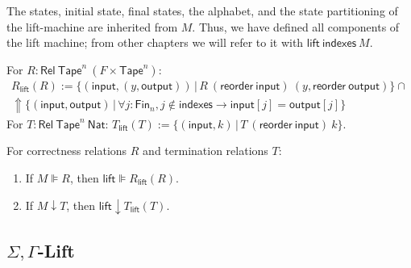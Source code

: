\documentclass{psartcl}
\newcommand{\MS}[1]{\textsf{#1}}
\newcommand{\setOf}[1]{\bigl \{ #1 \bigr \}}
\newcommand{\setMap}[2]{\setOf{#1 \,\big|\, #2}}
\newcommand{\Fin}{\MS{Fin}}
\newcommand{\Nat}{\MS{Nat}}
\newcommand{\Rel}{\mathsf{Rel}}
\newcommand{\Tape}{\MS{Tape}}
\newcommand{\Tapes}[1]{\Tape^{#1}}
\newcommand{\Tau}{\Gamma}
\DeclareMathOperator{\ignoreParam}{\Uparrow}
\begin{document}
The states, initial state, final states, the alphabet, and the state partitioning of the lift-machine are inherited from $M$.
Thus, we have defined all components of the lift machine; from other chapters we will refer to it with $\MS{lift}~\MS{indexes}~M$.

\begin{definition}
  \label{def:m,n-rellift}
  For $R : \Rel~\Tapes{n}~(F \times \Tapes{n})$:
  \begin{multline*}
    R_{\MS{lift}}(R) := \setMap{(\MS{input}, (y, \MS{output}))}{R~(\MS{reorder}~\MS{input})~(y,\MS{reorder}~\MS{output})} \cap \\
    \ignoreParam \setMap{(\MS{input},\MS{output})}{\forall j:\Fin_n, j \notin \MS{indexes} \rightarrow \MS{input}[j] = \MS{output}[j]}
  \end{multline*}
  For $T : \Rel~\Tapes{n}~\Nat$: $ T_{\MS{lift}}(T) := \setMap{(\MS{input}, k)}{T~(\MS{reorder}~\MS{input})~k} $.
\end{definition}

\begin{lemma}
  \label{lem:m,n-correctness}
  For correctness relations $R$ and termination relations $T$:
  \begin{enumerate}
    \item
      If $M \VDash R$, then $\MS{lift} \VDash R_{\MS{lift}}(R)$.
    \item
      If $M \downarrow T$, then $\MS{lift} \downarrow T_{\MS{lift}}(T)$.
  \end{enumerate}
\end{lemma}

\subsection{\texorpdfstring{$\Sigma,\Tau$}{Sigma,Gamma}-Lift}
\label{sub:sigma-gamma}
\end{document}
